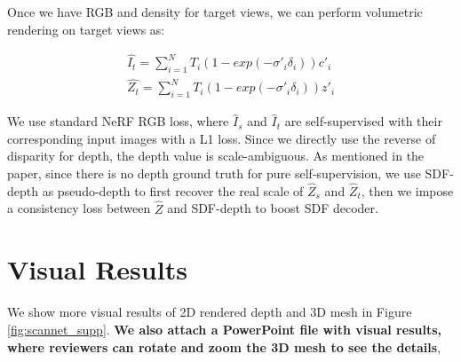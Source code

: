 Once we have RGB and density for target views, we can perform volumetric rendering on target views as: 

{
\begin{equation}
\begin{aligned}
    \hat{I_t} = \sum_{i=1}^{N}T_{i}(1-exp(-\sigma'_{i}\delta_{i}))c'_{i} \\
    \hat{Z_t} = \sum_{i=1}^{N}T_{i}(1-exp(-\sigma'_{i}\delta_{i}))z'_{i}
\end{aligned}
\label{eq:combined}
\end{equation}
}

We use standard NeRF RGB loss, where $\hat{I}_s$ and $\hat{I}_t$ are self-supervised with their corresponding input images with a L1 loss. Since we directly use the reverse of disparity for depth, the depth value is scale-ambiguous. As mentioned in the paper, since there is no depth ground truth for pure self-supervision, we use SDF-depth as pseudo-depth to first recover the real scale of $\hat{Z}_s$ and $\hat{Z}_t$, then we impose a consistency loss between $\hat{Z}$ and SDF-depth to boost SDF decoder.

    

\section{Visual Results}
We show more visual results of 2D rendered depth and 3D mesh in Figure \ref{fig:scannet_supp}. \textbf{We also attach a PowerPoint file with visual results, where reviewers can rotate and zoom the 3D mesh to see the details},

